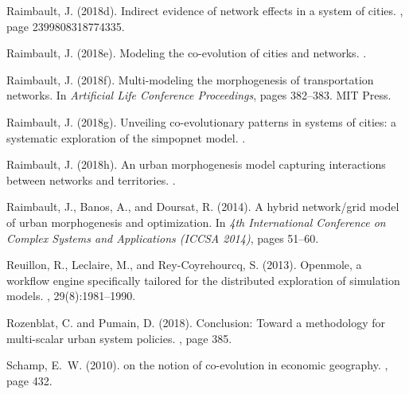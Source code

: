 \documentclass[11pt]{article}
\begin{document}
\begin{thebibliography}{}
Raimbault, J. (2018d).
\newblock Indirect evidence of network effects in a system of cities.
,
  page 2399808318774335.

Raimbault, J. (2018e).
\newblock Modeling the co-evolution of cities and networks.
.

Raimbault, J. (2018f).
\newblock Multi-modeling the morphogenesis of transportation networks.
\newblock In {\em Artificial Life Conference Proceedings}, pages 382--383. MIT
  Press.

Raimbault, J. (2018g).
\newblock Unveiling co-evolutionary patterns in systems of cities: a systematic
  exploration of the simpopnet model.
.

Raimbault, J. (2018h).
\newblock An urban morphogenesis model capturing interactions between networks
  and territories.
.

Raimbault, J., Banos, A., and Doursat, R. (2014).
\newblock A hybrid network/grid model of urban morphogenesis and optimization.
\newblock In {\em 4th International Conference on Complex Systems and
  Applications (ICCSA 2014)}, pages 51--60.

Reuillon, R., Leclaire, M., and Rey-Coyrehourcq, S. (2013).
\newblock Openmole, a workflow engine specifically tailored for the distributed
  exploration of simulation models.
, 29(8):1981--1990.

Rozenblat, C. and Pumain, D. (2018).
\newblock Conclusion: Toward a methodology for multi-scalar urban system
  policies.
,
  page 385.

Schamp, E.~W. (2010).
 on the notion of co-evolution in economic geography.
, page 432.


\end{thebibliography}
\end{document}
